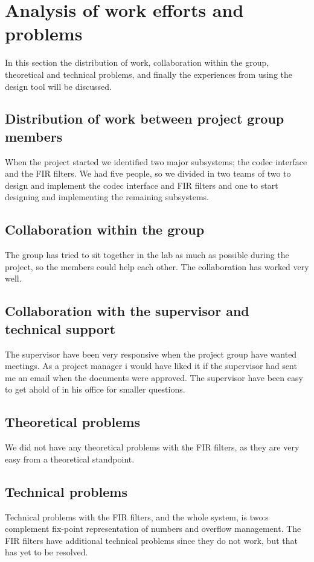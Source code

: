 \section{Analysis of work efforts and problems}
In this section the distribution of work, collaboration within the group, theoretical and technical problems, and finally the experiences from using the design tool will be discussed. 
\subsection{Distribution of work between project group members}
When the project started we identified two major subsystems; the codec interface and the FIR filters. We had five people, so we divided in two teams of two to design and implement the codec interface and FIR filters and one to start designing and implementing the remaining subsystems. 

\subsection{Collaboration within the group}
The group has tried to sit together in the lab as much as possible during the project, so the members could help each other. The collaboration has worked very well.

\subsection{Collaboration with the supervisor and technical support}
The supervisor have been very responsive when the project group have wanted meetings. As a project manager i would have liked it if the supervisor had sent me an email when the documents were approved. The supervisor have been easy to get ahold of in his office for smaller questions.

\subsection{Theoretical problems}
We did not have any theoretical problems with the FIR filters, as they are very easy from a theoretical standpoint.

\subsection{Technical problems}
Technical problems with the FIR filters, and the whole system, is two:s complement fix-point representation of numbers and overflow management. The FIR filters have additional technical problems since they do not work, but that has yet to be resolved.

